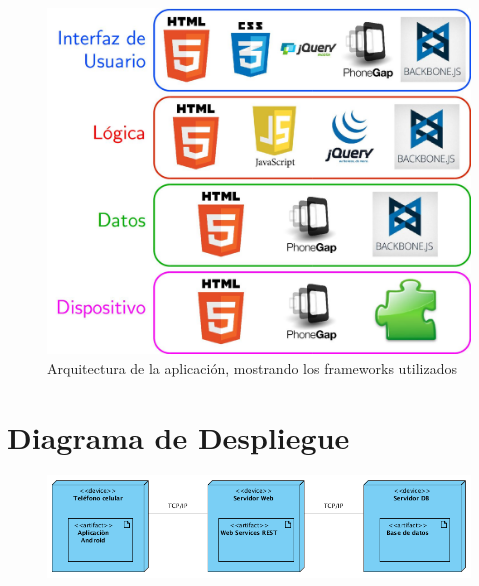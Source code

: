 \begin{figure}[H]
  \centering
    \includegraphics[width=1\textwidth]{imagenes/implementacion/arquitectura.jpg}
    
     \caption{Arquitectura de la aplicación, mostrando los frameworks utilizados}
    \label{fig:arquitectura-aplicacion}
\end{figure}

\section{Diagrama de Despliegue}

 \begin{figure}[H]
  \centering
    \includegraphics[width=1\textwidth]{imagenes/implementacion/despliegue.png}
    \label{diagrama-despliegue}
\end{figure}

